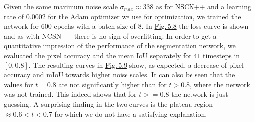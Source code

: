 %
Given the same maximum noise scale $\sigma_{max}\approx338$ as for NSCN++ and a learning rate of $0.0002$ for the Adam optimizer \cite{adam} we use for optimization, we trained the network for $600$ epochs with a batch size of $8$. In \hyperref[fig:5.8]{Fig.\,5.8} the loss curve is shown and as with NCSN++ there is no sign of overfitting. In order to get a quantitative impression of the performance of the segmentation network, we evaluated the pixel accuracy and the mean IoU separately for $41$ timesteps in $[0 ,0.8]$. The resulting curves in \hyperref[fig:5.9]{Fig.\,5.9} show, as expected, a decrease of pixel accuracy and mIoU towards higher noise scales. It can also be seen that the values for $t=0.8$ are not significantly higher than for $t>0.8$, where the network was not trained. This indeed shows that for $t>=0.8$ the network is just guessing. A surprising finding in the two curves is the plateau region $\approx0.6<t<0.7$ for which we do not have a satisfying explanation.
%
